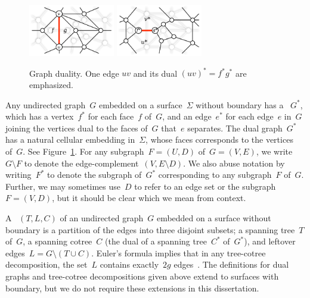 \begin{figure}[t]
\centering
\includegraphics[height=0.9in]{Fig/primal}\quad
\includegraphics[height=0.9in]{Fig/dual}
\caption{Graph duality.  One edge $uv$ and its dual $(uv)^* =
f^*g^*$ are emphasized.} \label{fig:prelims_primaldual}
\end{figure}

Any undirected graph~$G$ embedded on a surface~$\Sigma$ without boundary has a
~$G^*$, which has a vertex~$f^*$ for each face~$f$ of~$G$,
and an edge~$e^*$ for each edge~$e$ in~$G$ joining the vertices dual to the
faces of~$G$ that~$e$ separates. The dual graph~$G^*$ has a natural cellular
embedding in~$\Sigma$, whose faces corresponds to the vertices of~$G$.
See Figure~\ref{fig:prelims_primaldual}.
For any subgraph~${F = (U, D)}$ of~$G=(V,E)$, we write~$G \setminus F$
to denote the edge-complement~$(V,E \setminus D)$. We also abuse notation
by writing~$F^*$ to denote the subgraph of~$G^*$ corresponding to any
subgraph~$F$ of~$G$.
Further, we may sometimes use~$D$ to refer to an edge set or the subgraph~$F = (V, D)$,
but it should be clear which we mean from context.

A ~$(T,L,C)$ of an undirected
graph~$G$ embedded on a surface without boundary 
is a partition of the edges into three disjoint subsets;
a spanning tree~$T$ of~$G$, a spanning cotree~$C$ (the dual of a spanning
tree~$C^*$ of~$G^*$), and leftover edges~$L=G \setminus (T \cup C)$.
Euler's formula implies that in any tree-cotree decomposition, the set~$L$
contains exactly~$2g$ edges~\cite{e-dgteg-03}.
The definitions for dual
graphs and tree-cotree decompositions given above
extend to surfaces with boundary, but
we do not require these extensions in this dissertation.

